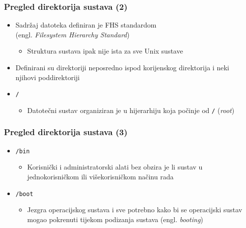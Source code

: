 \documentclass{beamer}
\begin{document}
\begin{frame}[t]
\frametitle{Pregled direktorija sustava (2)}
\begin{itemize}
  \item Sadržaj datoteka definiran je FHS standardom\\ (engl.
        \emph{Filesystem Hierarchy Standard})
  \begin{itemize}
    \item Struktura sustava ipak nije ista za sve Unix sustave
  \end{itemize}
  \item Definirani su direktoriji neposredno ispod korijenskog direktorija
        i neki njihovi poddirektoriji
  \item[] \texttt{/}
  \begin{itemize}
    \item Datotečni sustav organiziran je u hijerarhiju koja počinje od
          \texttt{/} (\emph{root})
  \end{itemize}
\end{itemize}
\end{frame}

\begin{frame}[t]
\frametitle{Pregled direktorija sustava (3)}
\begin{itemize}
  \item[] \texttt{/bin}
  \begin{itemize}
    \item Korisnički i administratorski alati bez obzira je li sustav u
          jednokorisničkom ili višekorisničkom načinu rada
  \end{itemize}
  \item[] \texttt{/boot}
  \begin{itemize}
    \item Jezgra operacijskog sustava i sve potrebno kako bi se operacijski
          sustav mogao pokrenuti tijekom podizanja sustava
          (engl. \emph{booting})
  \end{itemize}
\end{itemize}
\end{frame}
\end{document}
